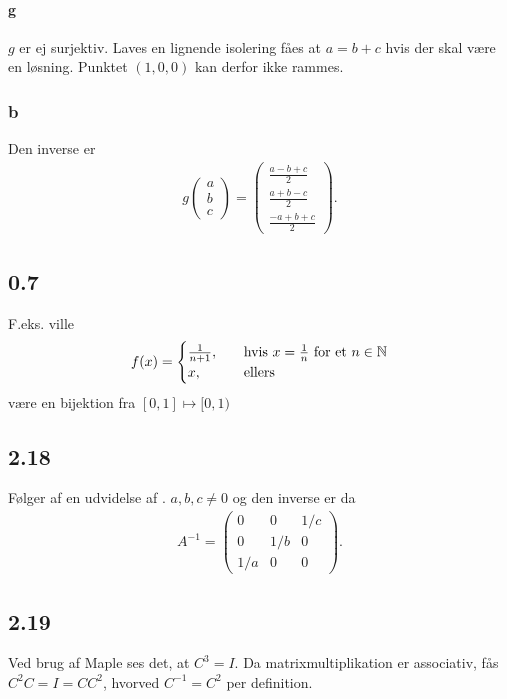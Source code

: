 			\paragraph{g} $g$ er ej surjektiv. Laves en lignende isolering fåes at $a=b+c$ hvis der skal være en løsning. Punktet $(1,0,0)$ kan derfor ikke rammes.

			\subsubsection{b}

			Den inverse er 
				\begin{align*}
					g\left(\begin{array}{l}{a} \\ {b} \\ {c}\end{array}\right)
					=\left(\begin{array}{l}{\frac{a-b+c}{2}} \\ {\frac{a+b-c}{2}} \\ {\frac{-a+b+c}{2}}\end{array}\right).
				\end{align*} 


		\subsection{0.7} 

			F.eks. ville
				\begin{align*}
					f(x)= \begin{cases}
					\frac{1}{n+1}, \quad &\text{hvis $x=\frac{1}{n}$ for et $n \in \mathbb{N}$}\\
					x, \quad &\text{ellers}
					\end{cases}
				\end{align*} 
			være en bijektion fra $[0,1] \mapsto [0,1)$

		\subsection{2.18}

			Følger af en udvidelse af \cite[Eksempel 0.1.4]{hesselholt2017}. $a,b,c\neq 0$ og den inverse er da 
				\begin{align*}
					A^{-1}=\left(\begin{array}{ccc} {0} & {0} & {1/c} \\ {0} & {1/b} & {0} \\ {1/a} & {0} & {0} \end{array}\right).
				\end{align*} 

		\subsection{2.19}

			Ved brug af Maple ses det, at $C^3 = I$. Da matrixmultiplikation er associativ, fås $C^2 C = I = C C^2$, hvorved $C^{-1} = C^2$ per definition.
